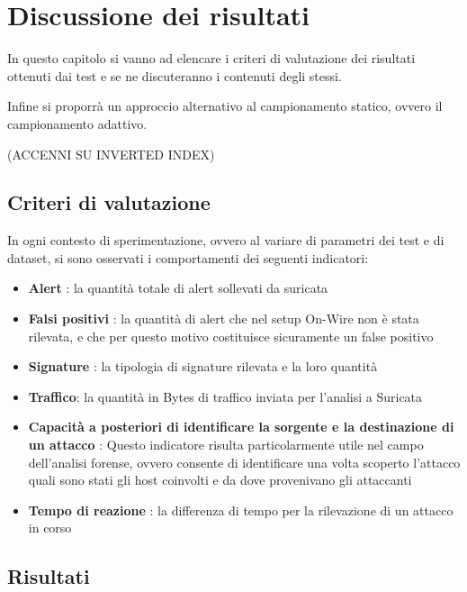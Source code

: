 \documentclass[12pt,a4paper,openright,twoside]{report}
\begin{document}
\chapter{Discussione dei risultati}                %
\lhead[\fancyplain{}{\bfseries\thepage}]{\fancyplain{}{\bfseries\rightmark}}

In questo capitolo si vanno ad elencare i criteri di valutazione dei risultati
ottenuti dai test e se ne discuteranno i contenuti degli stessi.

Infine si proporr\`a un approccio alternativo al campionamento statico, ovvero
il campionamento adattivo.

(ACCENNI SU INVERTED INDEX)

\section{Criteri di valutazione}
In ogni contesto di sperimentazione, ovvero al variare di parametri dei test e di
dataset, si sono osservati i comportamenti dei seguenti indicatori:
\begin{itemize}
  \item {\bf Alert} : la quantit\`a totale di alert sollevati da suricata
  \item {\bf Falsi positivi} : la quantit\`a di alert che nel setup On-Wire
  non \`e stata rilevata, e che per questo motivo costituisce sicuramente un false positivo
  \item {\bf Signature} : la tipologia di signature rilevata e la loro quantit\`a
  \item {\bf Traffico}: la quantit\`a in Bytes di traffico inviata per l'analisi
  a Suricata
  \item{\bf Capacit\`a a posteriori di identificare la sorgente e la destinazione di un
  attacco} : Questo indicatore risulta particolarmente utile nel campo dell'analisi forense,
  ovvero consente di identificare una volta scoperto l'attacco quali sono stati gli
  host coinvolti e da dove provenivano gli attaccanti
  \item {\bf Tempo di reazione} : la differenza di tempo per la rilevazione di
  un attacco in corso
\end{itemize}

\section{Risultati}
\end{document}
